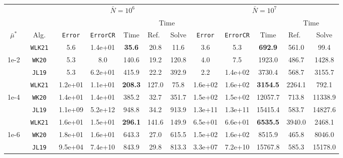 \begin{tabular}{ccccccc|ccccc}%
\toprule
& & \multicolumn{5}{c}{$\bar N = 10^6$} & \multicolumn{5}{c}{$\bar N = 10^7$} \\
\cmidrule(lr){3-7} \cmidrule(lr){8-12}
& & & & & \multicolumn{2}{c}{Time} & & & & \multicolumn{2}{c}{Time} \\
\cmidrule(lr){6-7} \cmidrule(lr){11-12}
$\bar\mu^*$   & Alg.        & \texttt{Error} & \texttt{ErrorCR} & Time      & Ref.\ & Solve & \texttt{Error} & \texttt{ErrorCR} & Time     & Ref.\  & Solve \\
\midrule
& \texttt{ WLK21 }&  5.6&  1.4e+01& \textbf{ 35.6 }&  20.8&  11.6&  3.6&  5.3& \textbf{ 692.9 }&  561.0&  99.4 \\
1e-2& \texttt{ WK20 }&  5.3&  8.0&  140.6&  19.2&  120.8&  4.0&  7.5&  1923.0&  486.7&  1428.8 \\
& \texttt{ JL19 }&  5.3&  6.2e+01&  415.9&  22.2&  392.9&  2.2&  1.4e+02&  3730.4&  568.7&  3155.7 \\
\midrule
& \texttt{ WLK21 }&  1.2e+01&  1.1e+01& \textbf{ 208.3 }&  127.0&  75.8&  1.6e+02&  1.6e+02& \textbf{ 3154.5 }&  2264.1&  792.1 \\
1e-4& \texttt{ WK20 }&  1.4e+01&  1.4e+01&  385.2&  32.7&  351.7&  1.5e+02&  1.5e+02&  12057.7&  713.8&  11338.9 \\
& \texttt{ JL19 }&  1.1e+09&  5.2e+12&  948.8&  34.2&  913.9&  1.3e+11&  1.3e+11&  15415.4&  583.7&  14827.6 \\
\midrule
& \texttt{ WLK21 }&  1.6e+01&  1.5e+01& \textbf{ 296.1 }&  141.6&  149.9&  6.5e+01&  6.6e+01& \textbf{ 6535.5 }&  3940.0&  2468.1 \\
1e-6& \texttt{ WK20 }&  1.8e+01&  1.6e+01&  643.3&  27.0&  615.5&  1.5e+02&  1.6e+02&  8515.9&  465.8&  8046.0 \\
& \texttt{ JL19 }&  9.5e+04&  7.4e+10&  843.9&  29.8&  813.3&  3.3e+07&  7.2e+10&  15767.8&  585.3&  15178.0 \\
\bottomrule
\end{tabular}

